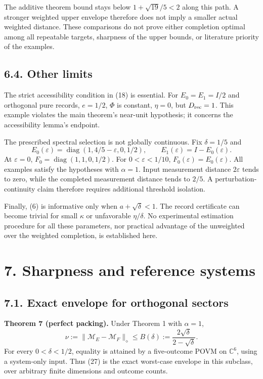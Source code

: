 \documentclass[
  11pt,
  a4paper,
]{article}
\begin{document}
The additive theorem bound stays below \(1+\sqrt{19}/5<2\) along this
path. A stronger weighted upper envelope therefore does not imply a
smaller actual weighted distance. These comparisons do not prove either
completion optimal among all repeatable targets, sharpness of the upper
bounds, or literature priority of the examples.

\subsection{6.4. Other limits}\label{other-limits}

The strict accessibility condition in (18) is essential. For
\(E_0=E_1=I/2\) and orthogonal pure records, \(e=1/2\), \(\Phi\) is
constant, \(\eta=0\), but \(D_{\rm rec}=1\). This example violates the
main theorem's near-unit hypothesis; it concerns the accessibility
lemma's endpoint.

The prescribed spectral selection is not globally continuous. Fix
\(\delta=1/5\) and
\[E_0(\varepsilon)=\operatorname{diag}(1,4/5-\varepsilon,0,1/2),
\qquad E_1(\varepsilon)=I-E_0(\varepsilon).\] At \(\varepsilon=0\),
\(F_0=\operatorname{diag}(1,1,0,1/2)\). For \(0<\varepsilon<1/10\),
\(F_0(\varepsilon)=E_0(\varepsilon)\). All examples satisfy the
hypotheses with \(\alpha=1\). Input measurement distance
\(2\varepsilon\) tends to zero, while the completed measurement distance
tends to \(2/5\). A perturbation-continuity claim therefore requires
additional threshold isolation.

Finally, (6) is informative only when \(a+\sqrt\delta<1\). The record
certificate can become trivial for small \(\kappa\) or unfavorable
\(\eta/\delta\). No experimental estimation procedure for all these
parameters, nor practical advantage of the unweighted over the weighted
completion, is established here.

\section{7. Sharpness and reference
systems}\label{sharpness-and-reference-systems}

\subsection{7.1. Exact envelope for orthogonal
sectors}\label{exact-envelope-for-orthogonal-sectors}

\textbf{Theorem 7 (perfect packing).} Under Theorem 1 with \(\alpha=1\),
\[\nu:=\|\mathcal M_E-\mathcal M_F\|_\diamond
\le B(\delta):=\frac{2\sqrt\delta}{2-\sqrt\delta}.
\tag{27}\] For every \(0<\delta<1/2\), equality is attained by a
five-outcome POVM on \(\mathbb C^6\), using a system-only input. Thus
(27) is the exact worst-case envelope in this subclass, over arbitrary
finite dimensions and outcome counts.
\end{document}
